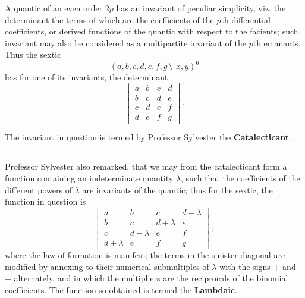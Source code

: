 \documentclass[12pt,a4paper]{article}
\begin{document}
A quantic of an even order $2p$ has an invariant of peculiar simplicity, viz. the determinant the terms of which are the coefficients of the $p$th differential coefficients, or derived functions of the quantic with respect to the facients; such invariant may also be considered as a multipartite invariant of the $p$th emanants. Thus the sextic
\[
(a, b, c, d, e, f, g\,\setminus\!\!\:\, x, y)^6
\]
has for one of its invariants, the determinant
\[
\begin{vmatrix}
a & b & c & d \\
b & c & d & e \\
c & d & e & f \\
d & e & f & g
\end{vmatrix}.
\]

The invariant in question is termed by Professor Sylvester the \textbf{Catalecticant}.

\subsection{}

Professor Sylvester also remarked, that we may from the catalecticant form a function containing an indeterminate quantity $\lambda$, such that the coefficients of the different powers of $\lambda$ are invariants of the quantic; thus for the sextic, the function in question is
\[
\begin{vmatrix}
a & b & c & d - \lambda \\
b & c & d + \lambda & e \\
c & d - \lambda & e & f \\
d + \lambda & e & f & g
\end{vmatrix},
\]
where the law of formation is manifest; the terms in the sinister diagonal are modified by annexing to their numerical submultiples of $\lambda$ with the signs $+$ and $-$ alternately, and in which the multipliers are the reciprocals of the binomial coefficients. The function so obtained is termed the \textbf{Lambdaic}.

\subsection{}
\end{document}

